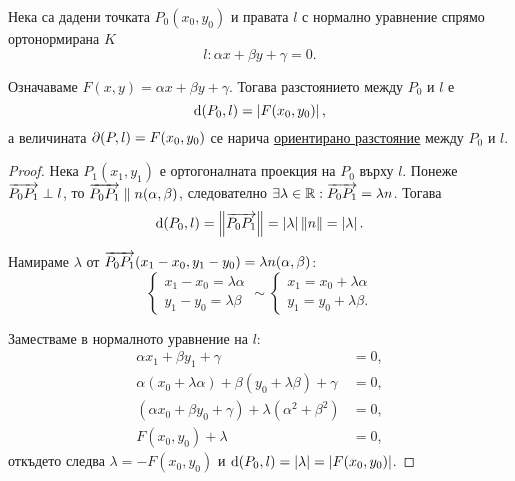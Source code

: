 \documentclass[numbers=endperiod, DIV=15]{scrartcl}
\begin{document}
\begin{theorem}\label{thm:plane-dist}
  Нека са дадени точката $P_0(x_0, y_0)$ и правата $l$ с нормално уравнение спрямо ортонормирана $K$
  \begin{displaymath}
    l: \alpha x + \beta y + \gamma = 0.
  \end{displaymath}

  Означаваме $F(x, y) = \alpha x + \beta y + \gamma$. Тогава разстоянието между $P_0$ и $l$ е
  \begin{displaymath}
    \operatorname{d}(P_0, l) = \left\vert F(x_0, y_0) \right\vert,
  \end{displaymath}
  а величината $\partial(P, l) = F(x_0, y_0)$ се нарича \underline{ориентирано разстояние} между $P_0$ и $l$.
\end{theorem}
\begin{proof}
  Нека $P_1(x_1, y_1)$ е ортогоналната проекция на $P_0$ върху $l$. Понеже $\overrightarrow{P_0 P_1} \perp l$, то $\overrightarrow{P_0 P_1} \parallel n(\alpha, \beta)$, следователно $\exists \lambda \in \mathbb{R}: \overrightarrow{P_0 P_1} = \lambda n$. Тогава
  \begin{displaymath}
    \operatorname{d}(P_0, l)
    =
    \left\Vert \overrightarrow{P_0 P_1} \right\Vert
    =
    \left\vert \lambda \right\vert \left\Vert n \right\Vert
    =
    \left\vert \lambda \right\vert.
  \end{displaymath}

  Намираме $\lambda$ от $\overrightarrow{P_0 P_1}(x_1 - x_0, y_1 - y_0) = \lambda n(\alpha, \beta)$:
  \begin{displaymath}
    \begin{cases}
      x_1 - x_0 = \lambda \alpha \\
      y_1 - y_0 = \lambda \beta
    \end{cases}
    \sim
    \begin{cases}
      x_1 = x_0 + \lambda \alpha \\
      y_1 = y_0 + \lambda \beta.
    \end{cases}
  \end{displaymath}

  Заместваме в нормалното уравнение на $l$:
  \begin{align*}
    \alpha x_1 + \beta y_1 + \gamma &= 0,
    \\
    \alpha (x_0 + \lambda \alpha) + \beta (y_0 + \lambda \beta) + \gamma &= 0,
    \\
    (\alpha x_0 + \beta y_0 + \gamma) + \lambda(\alpha^2 + \beta^2) &= 0,
    \\
    F(x_0, y_0) + \lambda &= 0,
  \end{align*}
  откъдето следва $\lambda = -F(x_0, y_0)$ и $\operatorname{d}(P_0, l) = \left\vert \lambda \right\vert = \left\vert F(x_0, y_0) \right\vert$.
\end{proof}
\end{document}

